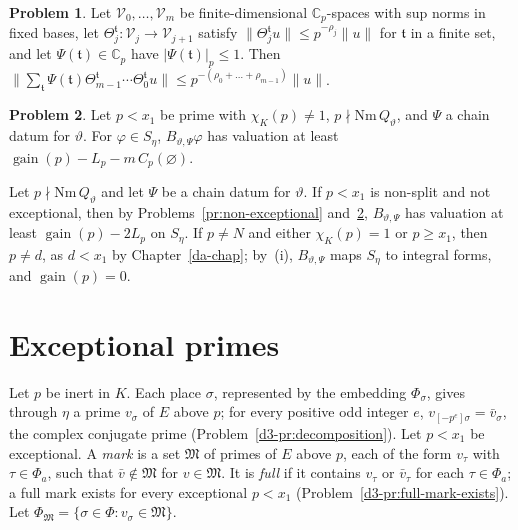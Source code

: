 \documentclass[reqno]{amsart}
\newcounter{chap}
\theoremstyle{definition}
\newtheorem{problem}{Problem}[section]
\theoremstyle{plain}
\theoremstyle{definition}
\theoremstyle{remark}
\newcommand{\C}{{\mathbb{C}}}
\newcommand{\gain}{\operatorname{gain}}
\newcommand{\Nm}{\mathrm{Nm}\,}
\newcommand{\Mk}{\mathfrak M}
\begin{document}
\begin{problem}\label{pr:gauge-chain}
Let \(\mathcal V_0, \dots, \mathcal V_m\) be finite-dimensional \(\C_p\)-spaces with sup norms in fixed bases, let \(\Theta^{\mathfrak t}_j\colon \mathcal V_j \to \mathcal V_{j+1}\) satisfy \(\lVert\Theta^{\mathfrak t}_j u\rVert \le p^{-\rho_j}\lVert u\rVert\) for \(\mathfrak t\) in a finite set, and let \(\Psi(\mathfrak t) \in \C_p\) have \(\lvert\Psi(\mathfrak t)\rvert_p \le 1\).  Then \(\bigl\lVert\sum_{\mathfrak t} \Psi(\mathfrak t)\Theta^{\mathfrak t}_{m-1}\cdots\Theta^{\mathfrak t}_0 u\bigr\rVert \le p^{-(\rho_0 + \dots + \rho_{m-1})}\lVert u\rVert\).
\end{problem}

\begin{problem}\label{pr:collision-chain}
Let \(p < x_1\) be prime with \(\chi_K(p) \ne 1\), \(p \nmid \Nm Q_\vartheta\), and \(\Psi\) a chain datum for \(\vartheta\).  For \(\varphi \in S_\eta\), \(B_{\vartheta,\Psi}\varphi\) has valuation at least \(\gain(p) - L_p - m\, C_p(\varnothing)\).
\end{problem}

Let \(p \nmid \Nm Q_\vartheta\) and let \(\Psi\) be a chain datum for \(\vartheta\).  If \(p < x_1\) is non-split and not exceptional, then by Problems~\ref{pr:non-exceptional} and~\ref{pr:collision-chain}, \(B_{\vartheta,\Psi}\) has valuation at least \(\gain(p) - 2L_p\) on \(S_\eta\).  If \(p \ne N\) and either \(\chi_K(p) = 1\) or \(p \ge x_1\), then \(p \ne d\), as \(d < x_1\) by Chapter~\ref{da-chap}; by~(i), \(B_{\vartheta,\Psi}\) maps \(S_\eta\) to integral forms, and \(\gain(p) = 0\).

\section{Exceptional primes}\label{sec:exceptional}

Let \(p\) be inert in \(K\).  Each place \(\sigma\), represented by the embedding \(\Phi_\sigma\), gives through \(\eta\) a prime \(v_\sigma\) of \(E\) above \(p\); for every positive odd integer \(e\), \(v_{[-p^e]\sigma} = \bar v_\sigma\), the complex conjugate prime (Problem~\ref{d3-pr:decomposition}).  Let \(p < x_1\) be exceptional.  A \emph{mark} is a set \(\Mk\) of primes of \(E\) above \(p\), each of the form \(v_\tau\) with \(\tau \in \Phi_a\), such that \(\bar v \notin \Mk\) for \(v \in \Mk\).  It is \emph{full} if it contains \(v_\tau\) or \(\bar v_\tau\) for each \(\tau \in \Phi_a\); a full mark exists for every exceptional \(p < x_1\) (Problem~\ref{d3-pr:full-mark-exists}).  Let \(\Phi_{\Mk} = \{\sigma \in \Phi : v_\sigma \in \Mk\}\).
\end{document}
